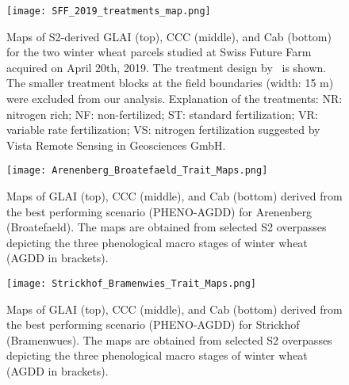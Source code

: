 \begin{figure}[H]
    \centering
    \texttt{[image: SFF\_2019\_treatments\_map.png]}
    \caption[Maps of S2-derived GLAI (top), CCC (middle), and Cab (bottom) for the two winter wheat parcels studied at Swiss Future Farm acquired on April 20th, 2019. The treatment design by~\cite{argento_investigating_2022} is shown. The smaller treatment blocks at the field boundaries (width: 15 m) were excluded from our analysis. Explanation of the treatments: NR: nitrogen rich; NF: non-fertilized; ST: standard fertilization; VR: variable rate fertilization; VS: nitrogen fertilization suggested by Vista Remote Sensing in Geosciences GmbH.]{Maps of S2-derived GLAI (top), CCC (middle), and Cab (bottom) for the two winter wheat parcels studied at Swiss Future Farm acquired on April 20th, 2019. The treatment design by~\cite{argento_investigating_2022} is shown. The smaller treatment blocks at the field boundaries (width: 15 m) were excluded from our analysis. Explanation of the treatments: NR: nitrogen rich; NF: non-fertilized; ST: standard fertilization; VR: variable rate fertilization; VS: nitrogen fertilization suggested by Vista Remote Sensing in Geosciences GmbH.}
    \label{fig:appendix_sff_2019}
\end{figure}


\begin{figure}[H]
    \centering
    \texttt{[image: Arenenberg\_Broatefaeld\_Trait\_Maps.png]}
    \caption[Maps of GLAI (top), CCC (middle), and Cab (bottom) derived from the best performing scenario (PHENO-AGDD) for Arenenberg (Broatefaeld). The maps are obtained from selected S2 overpasses depicting the three phenological macro stages of winter wheat (AGDD in brackets).]{Maps of GLAI (top), CCC (middle), and Cab (bottom) derived from the best performing scenario (PHENO-AGDD) for Arenenberg (Broatefaeld). The maps are obtained from selected S2 overpasses depicting the three phenological macro stages of winter wheat (AGDD in brackets).}
    \label{fig:appendix_arb_broatefaeld_2022}
\end{figure}

\begin{figure}[H]
    \centering
    \texttt{[image: Strickhof\_Bramenwies\_Trait\_Maps.png]}
    \caption[Maps of GLAI (top), CCC (middle), and Cab (bottom) derived from the best performing scenario (PHENO-AGDD) for Strickhof (Bramenwues). The maps are obtained from selected S2 overpasses depicting the three phenological macro stages of winter wheat (AGDD in brackets).]{Maps of GLAI (top), CCC (middle), and Cab (bottom) derived from the best performing scenario (PHENO-AGDD) for Strickhof (Bramenwues). The maps are obtained from selected S2 overpasses depicting the three phenological macro stages of winter wheat (AGDD in brackets).}
    \label{fig:appendix_sh_bramenwies_2022}
\end{figure}

